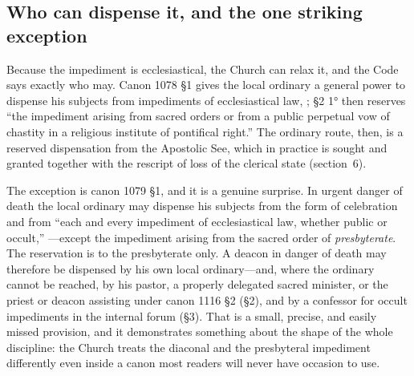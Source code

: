 \subsection{Who can dispense it, and the one striking exception}

Because the impediment is ecclesiastical, the Church can relax it, and the Code says exactly who may. Canon 1078 §1 gives the local ordinary a general power to dispense his subjects from impediments of ecclesiastical law, ; §2 1° then reserves ``the impediment arising from sacred orders or from a public perpetual vow of chastity in a religious institute of pontifical right.'' The ordinary route, then, is a reserved dispensation from the Apostolic See, which in practice is sought and granted together with the rescript of loss of the clerical state (section~6).

The exception is canon 1079 §1, and it is a genuine surprise. In urgent danger of death the local ordinary may dispense his subjects from the form of celebration and from ``each and every impediment of ecclesiastical law, whether public or occult,'' ---except the impediment arising from the sacred order of \emph{presbyterate}. The reservation is to the presbyterate only. A deacon in danger of death may therefore be dispensed by his own local ordinary---and, where the ordinary cannot be reached, by his pastor, a properly delegated sacred minister, or the priest or deacon assisting under canon 1116 §2 (§2), and by a confessor for occult impediments in the internal forum (§3). That is a small, precise, and easily missed provision, and it demonstrates something about the shape of the whole discipline: the Church treats the diaconal and the presbyteral impediment differently even inside a canon most readers will never have occasion to use.

